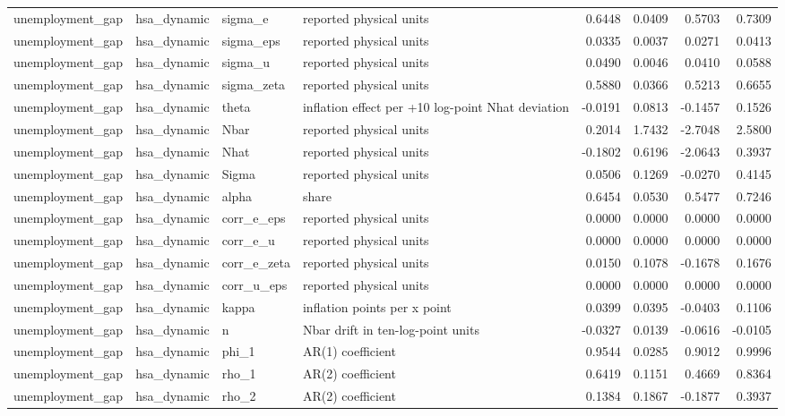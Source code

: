 \begin{tabular}{llllrrrr}
unemployment\_gap & hsa\_dynamic & sigma\_e & reported physical units & 0.6448 & 0.0409 & 0.5703 & 0.7309 \\
unemployment\_gap & hsa\_dynamic & sigma\_eps & reported physical units & 0.0335 & 0.0037 & 0.0271 & 0.0413 \\
unemployment\_gap & hsa\_dynamic & sigma\_u & reported physical units & 0.0490 & 0.0046 & 0.0410 & 0.0588 \\
unemployment\_gap & hsa\_dynamic & sigma\_zeta & reported physical units & 0.5880 & 0.0366 & 0.5213 & 0.6655 \\
unemployment\_gap & hsa\_dynamic & theta & inflation effect per +10 log-point Nhat deviation & -0.0191 & 0.0813 & -0.1457 & 0.1526 \\
unemployment\_gap & hsa\_dynamic & Nbar & reported physical units & 0.2014 & 1.7432 & -2.7048 & 2.5800 \\
unemployment\_gap & hsa\_dynamic & Nhat & reported physical units & -0.1802 & 0.6196 & -2.0643 & 0.3937 \\
unemployment\_gap & hsa\_dynamic & Sigma & reported physical units & 0.0506 & 0.1269 & -0.0270 & 0.4145 \\
unemployment\_gap & hsa\_dynamic & alpha & share & 0.6454 & 0.0530 & 0.5477 & 0.7246 \\
unemployment\_gap & hsa\_dynamic & corr\_e\_eps & reported physical units & 0.0000 & 0.0000 & 0.0000 & 0.0000 \\
unemployment\_gap & hsa\_dynamic & corr\_e\_u & reported physical units & 0.0000 & 0.0000 & 0.0000 & 0.0000 \\
unemployment\_gap & hsa\_dynamic & corr\_e\_zeta & reported physical units & 0.0150 & 0.1078 & -0.1678 & 0.1676 \\
unemployment\_gap & hsa\_dynamic & corr\_u\_eps & reported physical units & 0.0000 & 0.0000 & 0.0000 & 0.0000 \\
unemployment\_gap & hsa\_dynamic & kappa & inflation points per x point & 0.0399 & 0.0395 & -0.0403 & 0.1106 \\
unemployment\_gap & hsa\_dynamic & n & Nbar drift in ten-log-point units & -0.0327 & 0.0139 & -0.0616 & -0.0105 \\
unemployment\_gap & hsa\_dynamic & phi\_1 & AR(1) coefficient & 0.9544 & 0.0285 & 0.9012 & 0.9996 \\
unemployment\_gap & hsa\_dynamic & rho\_1 & AR(2) coefficient & 0.6419 & 0.1151 & 0.4669 & 0.8364 \\
unemployment\_gap & hsa\_dynamic & rho\_2 & AR(2) coefficient & 0.1384 & 0.1867 & -0.1877 & 0.3937 \\

\end{tabular}
